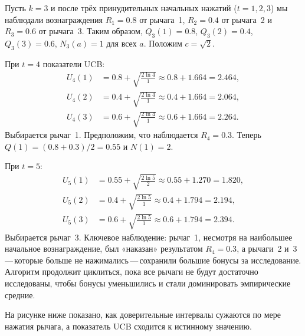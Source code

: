 \begin{example}
\label{ex:ucb1-trace}
Пусть $k=3$ и после трёх принудительных начальных нажатий ($t=1,2,3$) мы наблюдали вознаграждения $R_1=0.8$ от рычага~1, $R_2=0.4$ от рычага~2 и $R_3=0.6$ от рычага~3.  Таким образом, $Q_3(1)=0.8$, $Q_3(2)=0.4$, $Q_3(3)=0.6$, $N_3(a)=1$ для всех $a$.  Положим $c=\sqrt{2}$.

При $t=4$ показатели UCB:
\begin{align*}
U_4(1) &= 0.8 + \sqrt{\tfrac{2\ln 4}{1}} \approx 0.8 + 1.664 = 2.464,\\
U_4(2) &= 0.4 + \sqrt{\tfrac{2\ln 4}{1}} \approx 0.4 + 1.664 = 2.064,\\
U_4(3) &= 0.6 + \sqrt{\tfrac{2\ln 4}{1}} \approx 0.6 + 1.664 = 2.264.
\end{align*}
Выбирается рычаг~1.  Предположим, что наблюдается $R_4=0.3$.  Теперь $Q(1)=(0.8+0.3)/2=0.55$ и $N(1)=2$.

При $t=5$:
\begin{align*}
U_5(1) &= 0.55 + \sqrt{\tfrac{2\ln 5}{2}} \approx 0.55 + 1.270 = 1.820,\\
U_5(2) &= 0.4 + \sqrt{\tfrac{2\ln 5}{1}} \approx 0.4 + 1.794 = 2.194,\\
U_5(3) &= 0.6 + \sqrt{\tfrac{2\ln 5}{1}} \approx 0.6 + 1.794 = 2.394.
\end{align*}
Выбирается рычаг~3.  Ключевое наблюдение: рычаг~1, несмотря на наибольшее начальное вознаграждение, был «наказан» результатом $R_4=0.3$, а рычаги~2 и~3\,---\,которые больше не нажимались\,---\,сохранили большие бонусы за исследование.  Алгоритм продолжит циклиться, пока все рычаги не будут достаточно исследованы, чтобы бонусы уменьшились и стали доминировать эмпирические средние.
\end{example}

На рисунке ниже показано, как доверительные интервалы сужаются по мере нажатия рычага, а показатель UCB сходится к истинному значению.

